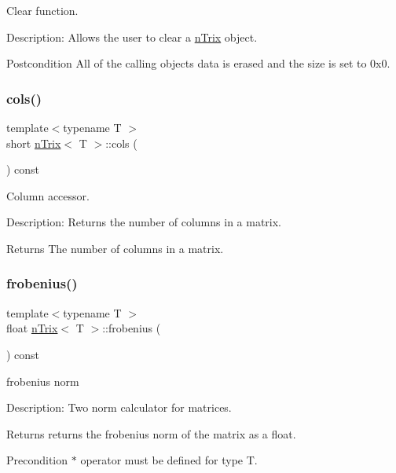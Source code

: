Clear function. 

Description\+: Allows the user to clear a \hyperlink{classnTrix}{n\+Trix} object. \begin{DoxyPostcond}{Postcondition}
All of the calling object\textquotesingle{}s data is erased and the size is set to 0x0. 
\end{DoxyPostcond}
\mbox{\label{classnTrix_ad0995ceefe1049d39280e139db121358}} 
\subsubsection{\texorpdfstring{cols()}{cols()}}
{\footnotesize\ttfamily template$<$typename T $>$ \\
short \hyperlink{classnTrix}{n\+Trix}$<$ T $>$\+::cols (\begin{DoxyParamCaption}{ }\end{DoxyParamCaption}) const}



Column accessor. 

Description\+: Returns the number of columns in a matrix. \begin{DoxyReturn}{Returns}
The number of columns in a matrix. 
\end{DoxyReturn}
\mbox{\label{classnTrix_a072250efd8048da611e8b42eda8458ad}} 
\subsubsection{\texorpdfstring{frobenius()}{frobenius()}}
{\footnotesize\ttfamily template$<$typename T $>$ \\
float \hyperlink{classnTrix}{n\+Trix}$<$ T $>$\+::frobenius (\begin{DoxyParamCaption}{ }\end{DoxyParamCaption}) const}



frobenius norm 

Description\+: Two norm calculator for matrices. \begin{DoxyReturn}{Returns}
returns the frobenius norm of the matrix as a float. 
\end{DoxyReturn}
\begin{DoxyPrecond}{Precondition}
$\ast$ operator must be defined for type T. 
\end{DoxyPrecond}
\mbox{\label{classnTrix_aa21e2d162693c9f031fcd69936d27485}} 
